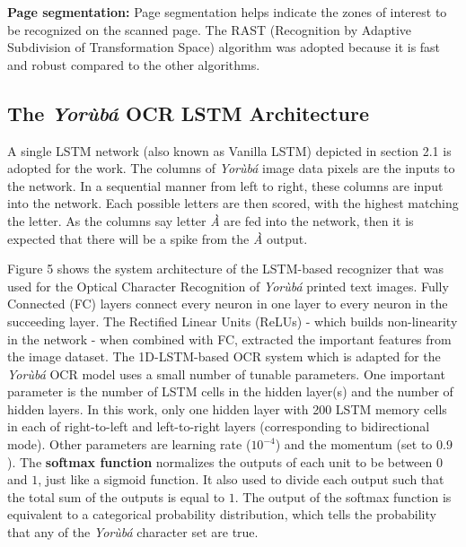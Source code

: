 \documentclass[review]{elsarticle}
\newcommand{\yor}{\textit{Yor\`ub\'a }}
\begin{document}
\textbf{Page segmentation:} Page segmentation helps indicate the zones of interest to be recognized on the scanned page. The RAST (Recognition by Adaptive Subdivision of Transformation Space) algorithm was adopted because it is fast and robust compared to the other algorithms. 

\subsection{The \yor OCR LSTM Architecture}
A single LSTM network (also known as Vanilla LSTM) depicted in section 2.1 is adopted for the work. The columns of \yor image data pixels are the inputs to the network. In a sequential manner from left to right, these columns are input into the network. Each possible letters are then scored, with the highest matching the letter. As the columns say letter \textit{\`{A}} are fed into the network, then it is expected that there will be a spike from the \textit{\`{A}} output.

Figure 5 shows the system architecture of the LSTM-based recognizer that was used for the Optical Character Recognition of \yor printed text images. Fully Connected (FC) layers connect every neuron in one layer to every neuron in the succeeding layer. The Rectified Linear Units (ReLUs) - which builds non-linearity in the network - when combined with FC, extracted the important features from the image dataset. The 1D-LSTM-based OCR system which is adapted for the \yor OCR model uses a small number of tunable parameters. One important parameter is the number of LSTM cells in the hidden layer(s) and the number of hidden layers. In this work, only one hidden layer with 200 LSTM memory cells in each of right-to-left and left-to-right layers (corresponding to bidirectional mode). Other parameters are learning rate ($10^{-4}$) and the momentum (set to $0.9$). The \textbf{softmax function} normalizes the outputs of each unit to be between $0$ and $1$, just like a sigmoid function. It also used to divide each output such that the total sum of the outputs is equal to $1$. The output of the softmax function is equivalent to a categorical probability distribution, which tells the probability that any of the \yor character set are true.
\end{document}
